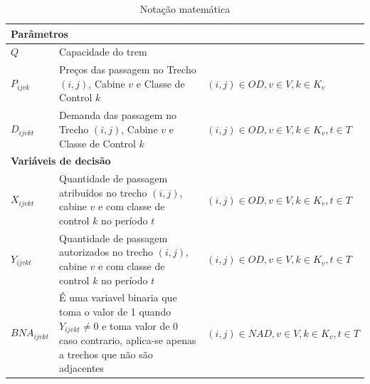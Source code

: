 \begin{table}[h]
\begin{tabular}{p{2cm} p{9.5cm} p{3.2cm}}
		\multicolumn{3}{l}{\textbf{Parâmetros}}                                                                                                                                                                                         \\ \midrule
		$Q$                & Capacidade do trem                                                                                                                                          &                                              \\
		$P_{ijvk}$         & Preços  das passagem no Trecho $(i,j)$, Cabine $v$ e Classe de Control $k$                                                                                  & $(i,j) \in OD,v \in V, k \in K_v$            \\
		$D_{ijvkt}$        & Demanda  das passagem no Trecho $(i,j)$, Cabine $v$ e Classe de Control $k$                                                                                 & $(i,j) \in OD,v \in V, k \in K_v, t \in T$   \\ \midrule
		\multicolumn{3}{l}{\textbf{Variáveis de decisão}}                                                                                                                                                                               \\ \midrule
		$X_{ijvkt}$        & Quantidade de passagem atribuídos no trecho $(i,j)$, cabine $v$ e com classe de control $k$ no período $t$                                                  & $(i,j) \in OD, v \in V, k \in K_v, t \in T$  \\
		$Y_{ijvkt}$        & Quantidade de passagem autorizados no trecho $(i,j)$, cabine $v$ e com classe de control $k$ no período $t$                                                 & $(i,j) \in OD, v \in V, k \in K_v, t \in T$  \\
		$BNA_{ijvkt}$      & É uma variavel binaria que toma o valor de 1 quando $Y_{ijvkt} \neq 0$ e toma  valor de 0 caso contrario, aplica-se apenas a trechos que não são adjacentes & $(i,j) \in NAD, v \in V, k \in K_v, t \in T$ \\
		\bottomrule
	\end{tabular}
	\caption{Notação matemática}
	\label{tab: m2_definicao}
\end{table}

